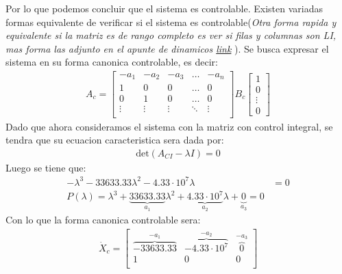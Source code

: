 \documentclass[
  11pt,
  letterpaper,
   addpoints,
   answers
  ]{exam}
\begin{document}
\begin{questions}
\begin{solution}
        Por lo que podemos concluir que el sistema es controlable. Existen variadas formas equivalente de verificar si el sistema es controlable(\textit{Otra forma rapida y equivalente si la matriz es de rango completo es ver si filas y columnas son LI, mas forma las adjunto en el apunte de dinamicos \href{https://www.u-cursos.cl/ingenieria/2024/1/EL3204/1/material_docente/detalle?id=7719473}{link}
        }). Se busca expresar el sistema en su forma canonica controlable, es decir:
        \begin{align}
            A_{c}=
            \begin{bmatrix}
                -a_{1} & -a_{2} & -a_{3} & \dots & -a_{n}\\
                1 & 0 & 0 & \dots & 0\\
                0 & 1 & 0 & \dots & 0\\
                \vdots & \vdots & \vdots & \ddots & \vdots\\
            \end{bmatrix}
            B_{c}
            \begin{bmatrix}
                1\\
                0\\
                \vdots\\
                0
            \end{bmatrix}
        \end{align}
        Dado que ahora consideramos el sistema con la matriz con control integral, se tendra que su ecuacion caracteristica sera dada por:
        \begin{align}
            \text{det}(A_{CI} - \lambda I) = 0
        \end{align}
        Luego se tiene que:
        \begin{align}
        -\lambda^{3} - 33633.33\lambda^{2} - 4.33 \cdot 10^{7} \lambda &= 0\\
        P(\lambda) = \lambda^3 + \underbrace{33633.33}_{a_1}\lambda^2 + \underbrace{4.33 \cdot 10^7}_{a_2}\lambda + \underbrace{0}_{a_3} = 0
        \end{align}
        Con lo que la forma canonica controlable sera:
        \begin{align}
            \dot{X}_c =
            \begin{bmatrix}
            \overbrace{-33633.33}^{-a_1} & \overbrace{-4.33 \cdot 10^7}^{-a_2} & \overbrace{0}^{-a_3} \\
            1 & 0 & 0 \\

\end{bmatrix}
\end{align}
\end{solution}
\end{questions}
\end{document}
